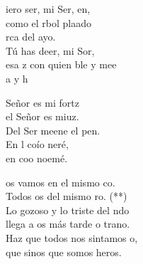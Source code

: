 \documentclass[12pt]{article}
\begin{document}
\begin{multicols*}{2}
\begin{cancion}%
	iero ser, mi Ser, en,\\
	como el rbol plaado\\
	rca del ayo.\\
	Tú has deer, mi Sor,\\
	esa z con quien ble y mee\\
	a y h \\
\end{cancion}%

\begin{cancion}%
	 Señor es mi fortz\\
	el Señor es miuz.\\
	Del Ser meene el pen. \\
	En l coío neré,\\
	en  coo noemé. \\
\end{cancion}%

\begin{cancion}%
	os vamos en el mismo co.\\
	Todos os del mismo ro. (**)\\
	Lo gozoso y lo triste del ndo\\
	llega a os más tarde o trano.\\
	Haz que todos nos sintamos o,\\
	que sinos que somos heros.\\
\end{cancion}%


\end{multicols*}
\end{document}
